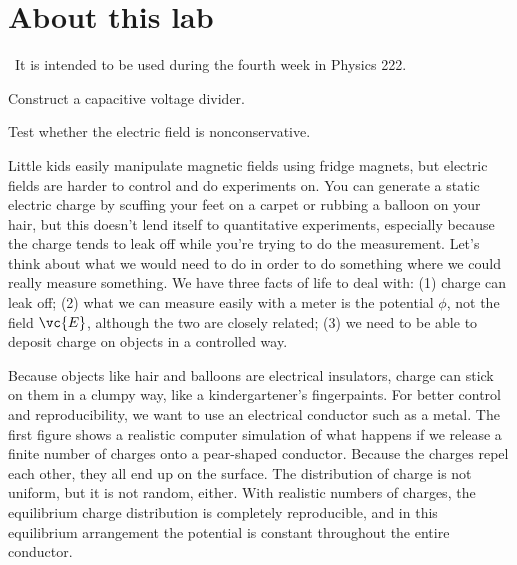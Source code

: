\renewcommand\thechapter{c2.4a}
\label{lab:electric-field}

\section*{About this lab}

\covid\ 
It is intended to be used during the fourth week in Physics 222.

\apparatus
{}

\begin{goals}

\item[] Construct a capacitive voltage divider.

\item[] Test whether the electric field is nonconservative.

\end{goals}

\introduction

Little kids easily manipulate magnetic fields using fridge magnets,
but electric fields are harder to control and do experiments on.
You can generate a static electric charge by scuffing your feet on
a carpet or rubbing a balloon on your hair, but this doesn't lend itself
to quantitative experiments, especially because the charge tends to
leak off while you're trying to do the measurement. Let's think about
what we would need to do in order to do something where we could really
measure something. We have three facts of life to deal with: (1) charge
can leak off; (2) what we can measure easily with a meter is the
potential $\phi$, not the field $\vc{E}$, although the two are closely
related; (3) we need to be able to deposit charge on objects in a controlled way.

Because objects like hair and balloons are electrical insulators,
charge can stick on them in a clumpy way, like a kindergartener's
fingerpaints. For better control and reproducibility, we want to use
an electrical conductor such as a metal. The first figure shows a realistic
computer simulation of what happens if we release a finite number of
charges onto a pear-shaped conductor. Because the charges  repel each
other, they all end up on the surface. The distribution of charge is
not uniform, but it is not random, either. With realistic numbers of
charges, the equilibrium charge distribution is completely reproducible,
and in this equilibrium arrangement the potential is constant throughout
the entire conductor.

